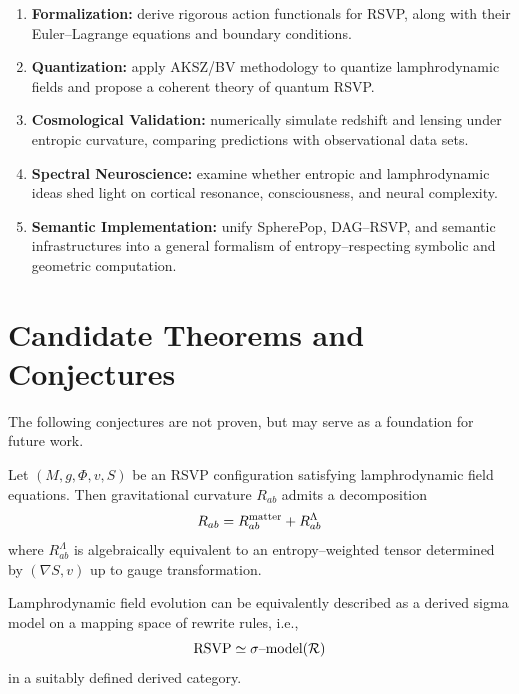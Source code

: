 \documentclass[12pt]{article}
\theoremstyle{plain}
\theoremstyle{definition}
\theoremstyle{remark}
\begin{document}
\begin{enumerate}
    \item \textbf{Formalization:} 
    derive rigorous action functionals for RSVP, along with their
    Euler--Lagrange equations and boundary conditions.

    \item \textbf{Quantization:} 
    apply AKSZ/BV methodology to quantize lamphrodynamic fields and propose
    a coherent theory of quantum RSVP.

    \item \textbf{Cosmological Validation:} 
    numerically simulate redshift and lensing under entropic curvature,
    comparing predictions with observational data sets.

    \item \textbf{Spectral Neuroscience:} 
    examine whether entropic and lamphrodynamic ideas shed light on cortical 
    resonance, consciousness, and neural complexity.

    \item \textbf{Semantic Implementation:} 
    unify SpherePop, DAG--RSVP, and semantic infrastructures into a general
    formalism of entropy--respecting symbolic and geometric computation.
\end{enumerate}


\section{Candidate Theorems and Conjectures}

The following conjectures are not proven, but may serve as a foundation for
future work.

\begin{conjecture}
Let $(M,g,\Phi,v,S)$ be an RSVP configuration satisfying lamphrodynamic field
equations. Then gravitational curvature $R_{ab}$ admits a decomposition
\[
    R_{ab} = R^{\rm matter}_{ab} + R^{\Lambda}_{ab}
\]
where $R^{\Lambda}_{ab}$ is algebraically equivalent to an entropy--weighted
tensor determined by $(\nabla S, v)$ up to gauge transformation. 
\end{conjecture}


\begin{conjecture}
Lamphrodynamic field evolution can be equivalently described as a derived
sigma model on a mapping space of rewrite rules, i.e.,
\[
    {\rm RSVP} \simeq \sigma\text{--model}(\mathcal{R})
\]
in a suitably defined derived category.
\end{conjecture}
\end{document}
